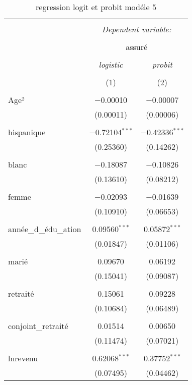 \documentclass[
  14pt,
  french,
]{article}
\begin{document}
\begin{table}[!htbp] \centering 
  \caption{regression logit et probit modéle 5} 
  \label{} 
\tiny 
\begin{tabular}{@{\extracolsep{5pt}}lcc} 
\\[-1.8ex]\hline 
\hline \\[-1.8ex] 
 & \multicolumn{2}{c}{\textit{Dependent variable:}} \\ 
\cline{2-3} 
\\[-1.8ex] & \multicolumn{2}{c}{assuré} \\ 
\\[-1.8ex] & \textit{logistic} & \textit{probit} \\ 
\\[-1.8ex] & (1) & (2)\\ 
\hline \\[-1.8ex] 
 Age² & $-$0.00010 & $-$0.00007 \\ 
  & (0.00011) & (0.00006) \\ 
  & & \\ 
 hispanique & $-$0.72104$^{***}$ & $-$0.42336$^{***}$ \\ 
  & (0.25360) & (0.14262) \\ 
  & & \\ 
 blanc & $-$0.18087 & $-$0.10826 \\ 
  & (0.13610) & (0.08212) \\ 
  & & \\ 
 femme & $-$0.02093 & $-$0.01639 \\ 
  & (0.10910) & (0.06653) \\ 
  & & \\ 
 année\_d\_édu\_ation & 0.09560$^{***}$ & 0.05872$^{***}$ \\ 
  & (0.01847) & (0.01106) \\ 
  & & \\ 
 marié & 0.09670 & 0.06192 \\ 
  & (0.15041) & (0.09087) \\ 
  & & \\ 
 retraité & 0.15061 & 0.09228 \\ 
  & (0.10684) & (0.06489) \\ 
  & & \\ 
 conjoint\_retraité & 0.01514 & 0.00650 \\ 
  & (0.11474) & (0.07021) \\ 
  & & \\ 
 lnrevenu & 0.62068$^{***}$ & 0.37752$^{***}$ \\ 
  & (0.07495) & (0.04462) \\ 

\end{tabular}
\end{table}
\end{document}
